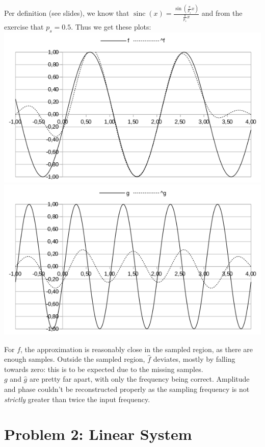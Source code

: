 \documentclass[a4paper,parskip,headheight=38pt]{scrartcl} %
\DeclareMathOperator{\sinc}{sinc}
\begin{document}
Per definition (see slides), we know that $\sinc(x) =
\frac{\sin\left(\frac{\pi}{p_s}x\right)}{\frac{\pi}{p_s}x}$ and from
the exercise that $p_s = 0.5$.  Thus we get these plots:
 \\
\includegraphics[width=\textwidth]{p1c_f}
 \\
\includegraphics[width=\textwidth]{p1c_g}

For $f$, the approximation is reasonably close in the sampled region,
as there are enough samples.  Outside the sampled region, $\hat{f}$
deviates, mostly by falling towards zero: this is to be expected due to
the missing samples.
 \\ %
$g$ and $\hat{g}$ are pretty far apart, with only the frequency being
correct.  Amplitude and phase couldn't be reconstructed properly as the
sampling frequency is not \emph{strictly} greater than twice the input
frequency.


\section*{Problem 2: Linear System}
\end{document}
